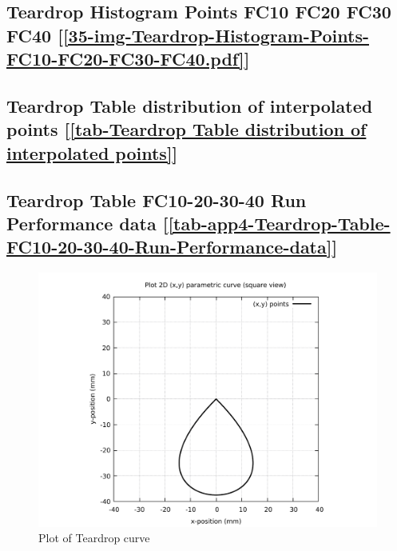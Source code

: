 \subsection       {Teardrop Histogram Points FC10 FC20 FC30 FC40
	[\ref      {35-img-Teardrop-Histogram-Points-FC10-FC20-FC30-FC40.pdf}] }
\label{ssec-35-img-Teardrop-Histogram-Points-FC10-FC20-FC30-FC40.pdf}

\subsection    {Teardrop Table distribution of interpolated points
	[\ref      {tab-Teardrop Table distribution of interpolated points}] }
\label{ssec-tab-Teardrop Table distribution of interpolated points}

\subsection         {Teardrop Table FC10-20-30-40 Run Performance data
	[\ref      {tab-app4-Teardrop-Table-FC10-20-30-40-Run-Performance-data}] }
\label{ssec-tab-app4-Teardrop-Table-FC10-20-30-40-Run-Performance-data}


\clearpage
\pagebreak

\begin{figure}
	\caption     {Plot of Teardrop curve}
	\label{01-img-Plot of Teardrop curve.pdf}
	\includegraphics[width=1.00\textwidth]{Chap4/appendix/app-Teardrop/plots/01-img-Plot of Teardrop curve.pdf}
\end{figure}	


